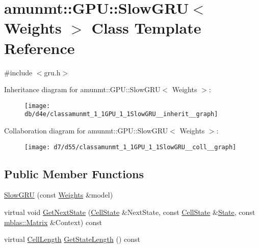 \hypertarget{classamunmt_1_1GPU_1_1SlowGRU}{}\section{amunmt\+:\+:G\+PU\+:\+:Slow\+G\+RU$<$ Weights $>$ Class Template Reference}
\label{classamunmt_1_1GPU_1_1SlowGRU}


{\ttfamily \#include $<$gru.\+h$>$}



Inheritance diagram for amunmt\+:\+:G\+PU\+:\+:Slow\+G\+RU$<$ Weights $>$\+:
\nopagebreak
\begin{figure}[H]
\begin{center}
\leavevmode
\texttt{[image: db/d4e/classamunmt\_1\_1GPU\_1\_1SlowGRU\_\_inherit\_\_graph]}
\end{center}
\end{figure}


Collaboration diagram for amunmt\+:\+:G\+PU\+:\+:Slow\+G\+RU$<$ Weights $>$\+:
\nopagebreak
\begin{figure}[H]
\begin{center}
\leavevmode
\texttt{[image: d7/d55/classamunmt\_1\_1GPU\_1\_1SlowGRU\_\_coll\_\_graph]}
\end{center}
\end{figure}
\subsection*{Public Member Functions}
\begin{DoxyCompactItemize}
\item 
\hyperlink{classamunmt_1_1GPU_1_1SlowGRU_acffc14f37cb72cef5d2fbc3dadd67b16}{Slow\+G\+RU} (const \hyperlink{structamunmt_1_1GPU_1_1Weights}{Weights} \&model)
\item 
virtual void \hyperlink{classamunmt_1_1GPU_1_1SlowGRU_a56abd7ee93ad637ca54113fbc1427e01}{Get\+Next\+State} (\hyperlink{structamunmt_1_1GPU_1_1CellState}{Cell\+State} \&Next\+State, const \hyperlink{structamunmt_1_1GPU_1_1CellState}{Cell\+State} \&\hyperlink{classamunmt_1_1State}{State}, const \hyperlink{namespaceamunmt_1_1GPU_1_1mblas_ab67821a8254de53e45a623cf73c0aef6}{mblas\+::\+Matrix} \&Context) const 
\item 
virtual \hyperlink{structamunmt_1_1GPU_1_1CellLength}{Cell\+Length} \hyperlink{classamunmt_1_1GPU_1_1SlowGRU_a2e14dcf46c2e4a4a171a43eec99dba87}{Get\+State\+Length} () const 
\end{DoxyCompactItemize}
